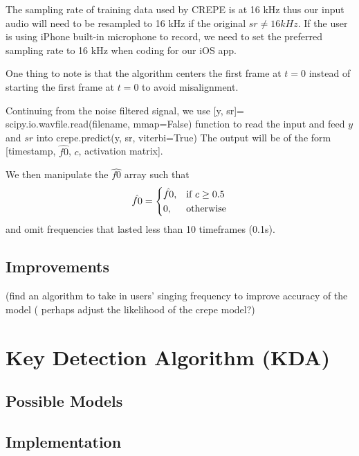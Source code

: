 The sampling rate of training data used by CREPE is at 16 kHz thus our input audio will need to be resampled to 16 kHz if the original $sr \neq 16 kHz$. If the user is using iPhone 
built-in microphone to record, we need to set the preferred sampling rate to 16 kHz \cite{iphoneaud} when coding for our iOS app.

One thing to note is that the algorithm centers the first frame at $t=0$ instead of starting the first frame at $t=0$ to avoid misalignment.

Continuing from the noise filtered signal, we use [y, sr]= scipy.io.wavfile.read(filename, mmap=False) function to read the input and feed $y$ and $sr$ into crepe.predict(y, sr, viterbi=True)
The output will be of the form [timestamp, $\hat{f0}$, $c$, activation matrix].

We then manipulate the $\hat{f0}$ array such that
\[\hat{f0}= 
\begin{dcases}
    \hat{f0},		& \text{if } c\geq 0.5\\
    0,              & \text{otherwise}
\end{dcases}
\]
and omit frequencies that lasted less than 10 timeframes (0.1s).
\subsection{Improvements}

(find an algorithm to take in users’ singing frequency to improve accuracy of the model ( perhaps adjust the likelihood of the crepe model?)


\section{Key Detection Algorithm (KDA)}

\subsection{Possible Models}


\subsection{Implementation}
